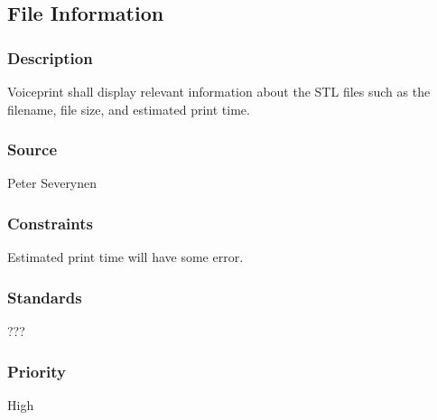 \subsection{File Information}
\subsubsection{Description}
Voiceprint shall display relevant information about the STL files such as the filename, file size, and estimated print time.
\subsubsection{Source}
Peter Severynen
\subsubsection{Constraints}
Estimated print time will have some error.
\subsubsection{Standards}
???
\subsubsection{Priority}
High